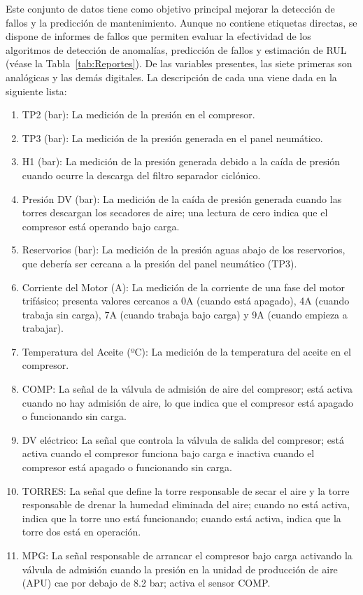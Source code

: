 \documentclass[12pt,letterpaper]{article}
\begin{document}
Este conjunto de datos tiene como objetivo principal mejorar la detección de fallos y la predicción de mantenimiento. 
Aunque no contiene etiquetas directas, se dispone de informes de fallos que permiten evaluar la efectividad de los algoritmos de detección de anomalías, predicción de fallos y estimación de RUL (véase la Tabla~\ref{tab:Reportes}).
De las variables presentes, las siete primeras son analógicas y las demás digitales. La descripción de cada una viene dada en la siguiente lista:
\begin{enumerate}
    \item TP2 (bar): La medición de la presión en el compresor.
    \item TP3 (bar): La medición de la presión generada en el panel neumático.
    \item H1 (bar): La medición de la presión generada debido a la caída de presión cuando ocurre la descarga del filtro separador ciclónico.
    \item Presión DV (bar): La medición de la caída de presión generada cuando las torres descargan los secadores de aire; una lectura de cero indica que el compresor está operando bajo carga.
    \item Reservorios (bar): La medición de la presión aguas abajo de los reservorios, que debería ser cercana a la presión del panel neumático (TP3).
    \item Corriente del Motor (A): La medición de la corriente de una fase del motor trifásico; presenta valores cercanos a 0A (cuando está apagado), 4A (cuando trabaja sin carga), 7A (cuando trabaja bajo carga) y 9A (cuando empieza a trabajar).
    \item Temperatura del Aceite (ºC): La medición de la temperatura del aceite en el compresor.
    \item COMP: La señal de la válvula de admisión de aire del compresor; está activa cuando no hay admisión de aire, lo que indica que el compresor está apagado o funcionando sin carga.
    \item DV eléctrico: La señal que controla la válvula de salida del compresor; está activa cuando el compresor funciona bajo carga e inactiva cuando el compresor está apagado o funcionando sin carga.
    \item TORRES: La señal que define la torre responsable de secar el aire y la torre responsable de drenar la humedad eliminada del aire; cuando no está activa, indica que la torre uno está funcionando; cuando está activa, indica que la torre dos está en operación.
    \item MPG: La señal responsable de arrancar el compresor bajo carga activando la válvula de admisión cuando la presión en la unidad de producción de aire (APU) cae por debajo de 8.2 bar; activa el sensor COMP.

\end{enumerate}
\end{document}
